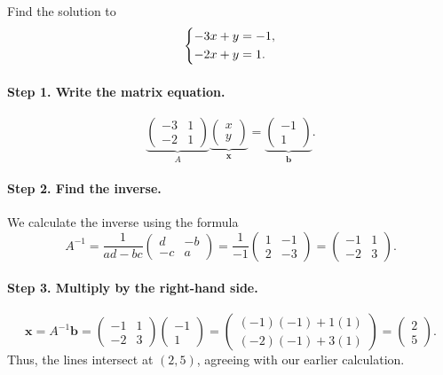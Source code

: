 \documentclass[10pt,letterpaper]{article}
\begin{document}
\begin{example}[6]{
Find the solution to
\[
\begin{dcases}
-3x+y=-1,\\
-2x+y=1.
\end{dcases}
\]
}
\paragraph{Step 1. Write the matrix equation.}
\[
\underbrace{
\begin{pmatrix}
-3&1\\
-2&1
\end{pmatrix}}_{A}
\underbrace{
\begin{pmatrix}x\\y\end{pmatrix}}_{\mathbf{x}}
=
\underbrace{
\begin{pmatrix}-1\\1\end{pmatrix}}_{\mathbf{b}}.
\]

\paragraph{Step 2. Find the inverse.}
We calculate the inverse using the formula
\[
A^{-1}
=\frac{1}{ad-bc}
\begin{pmatrix}
d&-b\\
-c&a
\end{pmatrix}
=\frac{1}{-1}
\begin{pmatrix}
1&-1\\
2&-3
\end{pmatrix}
=
\begin{pmatrix}
-1&1\\
-2&3
\end{pmatrix}.
\]

\paragraph{Step 3. Multiply by the right-hand side.}
\[
\mathbf{x}=A^{-1}\mathbf{b}
=
\begin{pmatrix}
-1&1\\
-2&3
\end{pmatrix}
\begin{pmatrix}-1\\1\end{pmatrix}
=
\begin{pmatrix}
(-1)(-1)+1(1)\\
(-2)(-1)+3(1)
\end{pmatrix}
=
\boxed{
\begin{pmatrix}2\\5\end{pmatrix}.
}
\]
Thus, the lines intersect at $(2,5)$, agreeing
with our earlier calculation.
\end{example}
\end{document}
